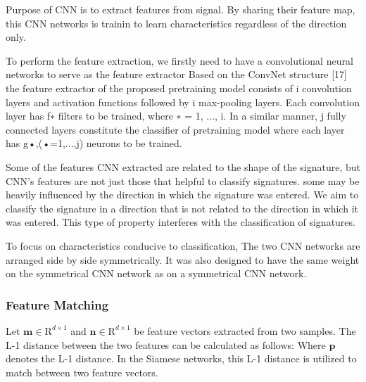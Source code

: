 \documentclass[runningheads]{llncs}
\begin{document}
Purpose of CNN is to extract features from signal.
By sharing their feature map, this CNN networks is trainin to learn characteristics regardless of the direction only.

To perform the feature extraction, we firstly need to have a convolutional neural networks  to serve as the feature extractor
Based on the ConvNet structure [17] the feature extractor of the proposed pretraining model consists of i convolution layers and activation functions followed by i max-pooling layers. Each convolution layer has f∗ filters to be trained, where ∗ = 1, ..., i. In a similar manner, j fully connected layers constitute the classifier of pretraining model where each layer has g•,(•=1,...,j) neurons to be trained. 

Some of the features CNN extracted are related to the shape of the signature, but CNN's features are not just those that helpful to classify signatures. some may be heavily influenced by the direction in which the signature was entered.
We aim to classify the signature in a direction that is not related to the direction in which it was entered. This type of property interferes with the classification of signatures.

To focus on characteristics conducive to classification, The two CNN networks are arranged side by side symmetrically.
It was also designed to have the same weight on the symmetrical CNN network as on a symmetrical CNN network. 






\subsubsection{Feature Matching}

Let $\mathbf{m}\in{\mathrm{R}}^{d\times1}$ and $\mathbf{n}\in{\mathrm{R}}^{d\times1}$ be feature vectors extracted from two samples.
The L-1 distance between the two features can be calculated as  follows:
Where $\mathbf{p}$ denotes the L-1 distance. In the Siamese networks, this L-1 distance is utilized to match between two feature vectors.
\end{document}
